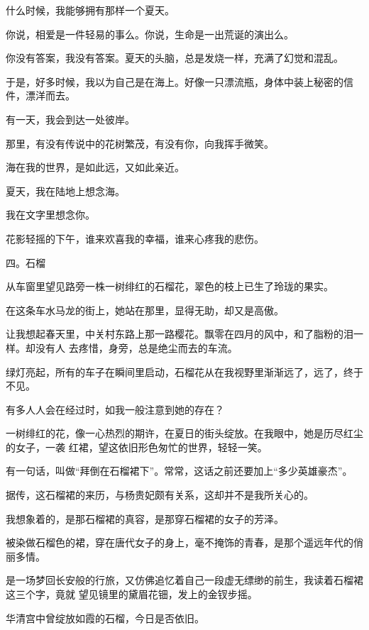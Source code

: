 \documentclass[12pt,a4paper]{article}
\def\blankrev{\vspace{1ex}}									%
\newcommand{\subpart}[1]{
	\begingroup \par
	\vspace{1ex} \centering #1
	\par \endgroup
}
\begin{document}
		\blankrev
		什么时候，我能够拥有那样一个夏天。

		\blankrev
		你说，相爱是一件轻易的事么。你说，生命是一出荒诞的演出么。\par
		你没有答案，我没有答案。夏天的头脑，总是发烧一样，充满了幻觉和混乱。\par
		于是，好多时候，我以为自己是在海上。好像一只漂流瓶，身体中装上秘密的信件，漂洋而去。\par
		有一天，我会到达一处彼岸。\par
		那里，有没有传说中的花树繁茂，有没有你，向我挥手微笑。\par
		海在我的世界，是如此远，又如此亲近。

		\blankrev
		夏天，我在陆地上想念海。\par
		我在文字里想念你。

	\endwriting




		花影轻摇的下午，谁来欢喜我的幸福，谁来心疼我的悲伤。


		\subpart{四。石榴}

		从车窗里望见路旁一株一树绯红的石榴花，翠色的枝上已生了玲珑的果实。\par
		在这条车水马龙的街上，她站在那里，显得无助，却又是高傲。

		让我想起春天里，中关村东路上那一路樱花。飘零在四月的风中，和了脂粉的泪一样。却没有人
	去疼惜，身旁，总是绝尘而去的车流。

		绿灯亮起，所有的车子在瞬间里启动，石榴花从在我视野里渐渐远了，远了，终于不见。\par
		有多人人会在经过时，如我一般注意到她的存在？

		一树绯红的花，像一心热烈的期许，在夏日的街头绽放。在我眼中，她是历尽红尘的女子，一袭
	红裙，望这依旧形色匆忙的世界，轻轻一笑。

		\blankrev
		有一句话，叫做“拜倒在石榴裙下”。常常，这话之前还要加上“多少英雄豪杰”。\par
		据传，这石榴裙的来历，与杨贵妃颇有关系，这却并不是我所关心的。\par
		我想象着的，是那石榴裙的真容，是那穿石榴裙的女子的芳泽。\par
		被染做石榴色的裙，穿在唐代女子的身上，毫不掩饰的青春，是那个遥远年代的俏丽多情。

		是一场梦回长安般的行旅，又仿佛追忆着自己一段虚无缥缈的前生，我读着石榴裙这三个字，竟就
	望见镜里的黛眉花钿，发上的金钗步摇。

		华清宫中曾绽放如霞的石榴，今日是否依旧。
\end{document}
